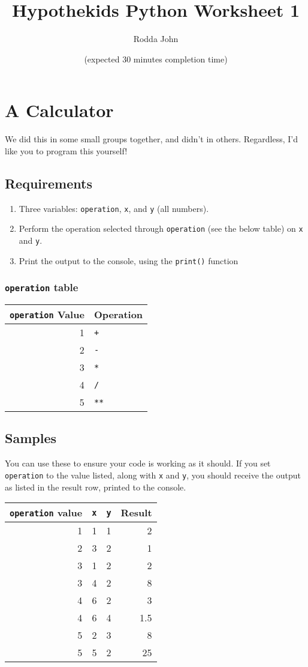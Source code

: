 \documentclass[11pt]{article}
\author{Rodda John}
\date{(expected 30 minutes completion time)}
\title{Hypothekids Python Worksheet 1}
\begin{document}
\maketitle

\section{A Calculator}
\label{sec:org8a2818f}
We did this in some small groups together, and didn't in others.  Regardless, I'd like you to program this yourself!
\subsection{Requirements}
\label{sec:org2a94cc8}
\begin{enumerate}
\item Three variables: \texttt{operation}, \texttt{x}, and \texttt{y} (all numbers).
\item Perform the operation selected through \texttt{operation} (see the below table) on \texttt{x} and \texttt{y}.
\item Print the output to the console, using the \texttt{print()} function
\end{enumerate}
\subsubsection{\texttt{operation} table}
\label{sec:org5e8bee4}
\begin{center}
\begin{tabular}{rl}
\texttt{operation} Value & Operation\\
\hline
1 & \texttt{+}\\
2 & \texttt{-}\\
3 & \texttt{*}\\
4 & \texttt{/}\\
5 & \texttt{**}\\
\end{tabular}
\end{center}
\subsection{Samples}
\label{sec:orgc7fb7ae}
You can use these to ensure your code is working as it should.  If you set \texttt{operation} to the value listed, along with \texttt{x} and \texttt{y}, you should receive the output as listed in the result row, printed to the console.
\begin{center}
\begin{tabular}{rrrr}
\texttt{operation} value & \texttt{x} & \texttt{y} & Result\\
\hline
1 & 1 & 1 & 2\\
2 & 3 & 2 & 1\\
3 & 1 & 2 & 2\\
3 & 4 & 2 & 8\\
4 & 6 & 2 & 3\\
4 & 6 & 4 & 1.5\\
5 & 2 & 3 & 8\\
5 & 5 & 2 & 25\\
\end{tabular}
\end{center}
\end{document}
